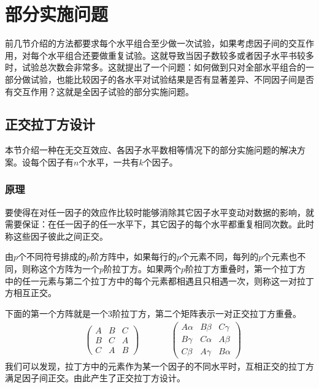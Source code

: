 \chapter{部分实施问题}
前几节介绍的方法都要求每个水平组合至少做一次试验，如果考虑因子间的交互作用，对每个水平组合还要做重复试验。这就导致当因子数较多或者因子水平书较多时，试验总次数会非常多。这就提出了一个问题：如何做到只对全部水平组合的一部分做试验，也能比较因子的各水平对试验结果是否有显著差异、不同因子间是否有交互作用？这就是全因子试验的部分实施问题。

\section{正交拉丁方设计}
本节介绍一种在无交互效应、各因子水平数相等情况下的部分实施问题的解决方案。设每个因子有$n$个水平，一共有$k$个因子。
\subsection*{原理}
要使得在对任一因子的效应作比较时能够消除其它因子水平变动对数据的影响，就需要保证：在任一因子的任一水平下，其它因子的每个水平都重复相同次数。此时称这些因子彼此之间正交。
\begin{definition}
	由$p$个不同符号排成的$p$阶方阵中，如果每行的$p$个元素不同，每列的$p$个元素也不同，则称这个方阵为一个$p$阶拉丁方。如果两个$p$阶拉丁方重叠时，第一个拉丁方中的任一元素与第二个拉丁方中的每个元素都相遇且只相遇一次，则称这一对拉丁方相互正交。
\end{definition}
下面的第一个方阵就是一个$3$阶拉丁方，第二个矩阵表示一对正交拉丁方重叠。
\begin{equation*}
	\begin{aligned}
		&\begin{pmatrix}
			A & B & C \\
			B & C & A \\
			C & A & B
		\end{pmatrix}
		\quad &\quad
		&\begin{pmatrix}
			A\alpha & B\beta & C\gamma \\
			B\gamma & C\alpha & A\beta \\
			C\beta & A\gamma & B\alpha
		\end{pmatrix}
	\end{aligned}
\end{equation*}
我们可以发现，拉丁方中的元素作为某一个因子的不同水平时，互相正交的拉丁方满足因子间正交。由此产生了正交拉丁方设计。
